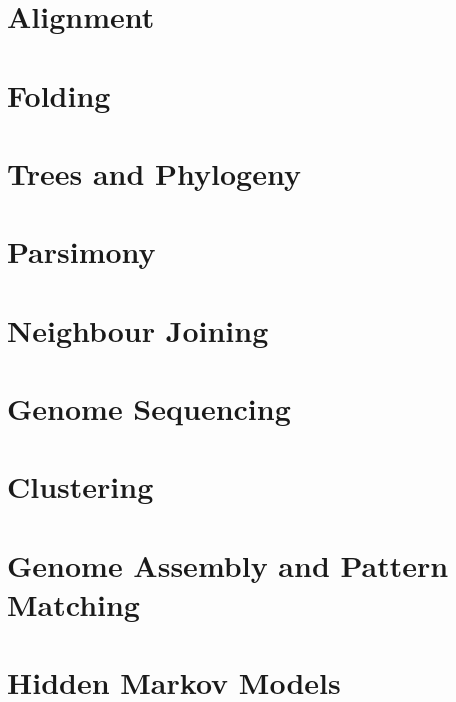\documentclass{article}
\begin{document}
\section{Alignment}

\section{Folding}

\section{Trees and Phylogeny}

\section{Parsimony}

\section{Neighbour Joining}

\section{Genome Sequencing}

\section{Clustering}

\section{Genome Assembly and Pattern Matching}

\section{Hidden Markov Models}
\end{document}
